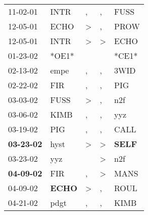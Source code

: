 \begin{supertabular}{p{0.07\textwidth}p{0.06\textwidth}p{0.02\textwidth}p{0.02\textwidth}p{0.06\textwidth}}
          11-02-01\textsuperscript{} &           INTR\textsuperscript{} &                , &                , &           FUSS\textsuperscript{} \\
          12-05-01\textsuperscript{} &           ECHO\textsuperscript{} &     \textgreater &                , &           PROW\textsuperscript{} \\
          12-05-01\textsuperscript{} &           INTR\textsuperscript{} &     \textgreater &     \textgreater &           ECHO\textsuperscript{} \\
          01-23-02\textsuperscript{} &                            *OE1* &                  &                  &                            *CE1* \\
          02-13-02\textsuperscript{} &           empe\textsuperscript{} &                , &                , &           3WID\textsuperscript{} \\
          02-22-02\textsuperscript{} &            FIR\textsuperscript{} &                , &                , &            PIG\textsuperscript{} \\
          03-03-02\textsuperscript{} &           FUSS\textsuperscript{} &     \textgreater &                , &            n2f\textsuperscript{} \\
          03-06-02\textsuperscript{} &           KIMB\textsuperscript{} &                , &                , &            yyz\textsuperscript{} \\
          03-19-02\textsuperscript{} &            PIG\textsuperscript{} &                , &                , &           CALL\textsuperscript{} \\
 \textbf{03-23-02\textsuperscript{}} &           hyst\textsuperscript{} &     \textgreater &     \textgreater &  \textbf{SELF\textsuperscript{}} \\
          03-23-02\textsuperscript{} &            yyz\textsuperscript{} &                  &     \textgreater &            n2f\textsuperscript{} \\
 \textbf{04-09-02\textsuperscript{}} &            FIR\textsuperscript{} &                , &     \textgreater &           MANS\textsuperscript{} \\
          04-09-02\textsuperscript{} &  \textbf{ECHO\textsuperscript{}} &     \textgreater &                , &           ROUL\textsuperscript{} \\
          04-21-02\textsuperscript{} &           pdgt\textsuperscript{} &                , &                , &           KIMB\textsuperscript{} \\

\end{supertabular}
